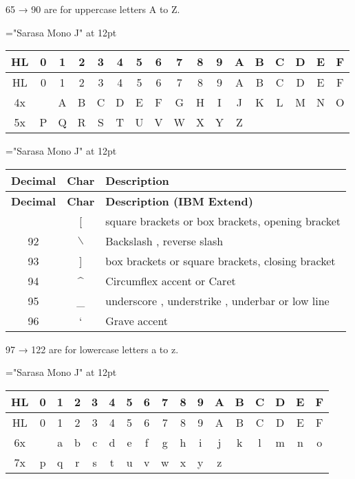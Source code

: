 65 → 90 are for uppercase letters A to Z.

{\font\rm="Sarasa Mono J" at 12pt \rm 
\begin{longtable}{|c|c|c|c|c|c|c|c|c|c|c|c|c|c|c|c|c|}
	\hline
	HL&0&1&2&3&4&5&6&7&8&9&A&B&C&D&E&F\\\hline
	\endfirsthead\hline
	HL&0&1&2&3&4&5&6&7&8&9&A&B&C&D&E&F\\\hline
	\endhead\hline\endfoot\hline\endlastfoot
4x& &A&B&C&D&E&F&G&H&I&J&K&L&M&N&O\\\hline
5x&P&Q&R&S&T&U&V&W&X&Y&Z& & & & & \\\hline
\end{longtable}
}

{\font\rm="Sarasa Mono J" at 12pt \rm 
\begin{center}\begin{longtable}{|c|c|l|}
	\hline
	\textbf{Decimal} & \textbf{Char} & \textbf{Description} \\
	\hline\endfirsthead\hline
	\textbf{Decimal} & \textbf{Char} & \textbf{Description (IBM Extend)} \\
	\hline\endhead\hline\endfoot\hline\endlastfoot
91 & [ & square brackets or box brackets, opening bracket \\\hline
92 &$\backslash$& Backslash , reverse slash \\\hline
93 & ] & box brackets or square brackets, closing bracket \\\hline
94 & \^& Circumflex accent or Caret \\\hline
95 & \_& underscore , understrike , underbar or low line \\\hline
96 & ` & Grave accent \\\hline
\end{longtable}\end{center}
}

97 → 122 are for lowercase letters a to z.

{\font\rm="Sarasa Mono J" at 12pt \rm 
\begin{longtable}{|c|c|c|c|c|c|c|c|c|c|c|c|c|c|c|c|c|}
	\hline
	HL&0&1&2&3&4&5&6&7&8&9&A&B&C&D&E&F\\\hline
	\endfirsthead\hline
	HL&0&1&2&3&4&5&6&7&8&9&A&B&C&D&E&F\\\hline
	\endhead\hline\endfoot\hline\endlastfoot
6x& &a&b&c&d&e&f&g&h&i&j&k&l&m&n&o\\\hline
7x&p&q&r&s&t&u&v&w&x&y&z& & & & & \\\hline
\end{longtable}
}

